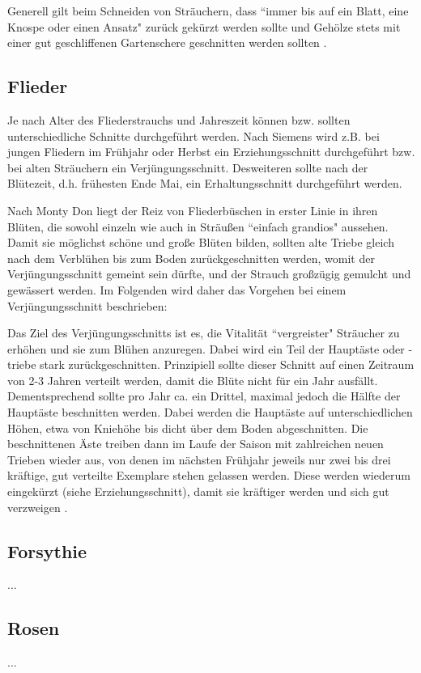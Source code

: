 \documentclass[]{article}
\begin{document}
Generell gilt beim Schneiden von Sträuchern, dass ``immer bis auf ein Blatt, eine Knospe oder einen Ansatz" zurück gekürzt werden sollte und Gehölze stets mit einer gut geschliffenen Gartenschere geschnitten werden sollten \cite[S.~257]{Don2021}.

\subsection{Flieder}

Je nach Alter des Fliederstrauchs und Jahreszeit können bzw. sollten unterschiedliche Schnitte durchgeführt werden.
Nach Siemens \cite{Siemens2021} wird z.B. bei jungen Fliedern im Frühjahr oder Herbst ein Erziehungsschnitt durchgeführt bzw. bei alten Sträuchern ein Verjüngungsschnitt.
Desweiteren sollte nach der Blütezeit, d.h. frühesten Ende Mai, ein Erhaltungsschnitt durchgeführt werden.

Nach Monty Don \cite[S.~258]{Don2021} liegt der Reiz von Fliederbüschen in erster Linie in ihren Blüten, die sowohl einzeln wie auch in Sträußen ``einfach grandios" aussehen.
Damit sie möglichst schöne und große Blüten bilden, sollten alte Triebe gleich nach dem Verblühen bis zum Boden zurückgeschnitten werden, womit der Verjüngungsschnitt gemeint sein dürfte, und der Strauch großzügig gemulcht und gewässert werden.
Im Folgenden wird daher das Vorgehen bei einem Verjüngungsschnitt beschrieben:

Das Ziel des Verjüngungsschnitts ist es, die Vitalität ``vergreister" Sträucher zu erhöhen und sie zum Blühen anzuregen. 
Dabei wird ein Teil der Hauptäste oder -triebe stark zurückgeschnitten.
Prinzipiell sollte dieser Schnitt auf einen Zeitraum von 2-3 Jahren verteilt werden, damit die Blüte nicht für ein Jahr ausfällt.
Dementsprechend sollte pro Jahr ca. ein Drittel, maximal jedoch die Hälfte der Hauptäste beschnitten werden.
Dabei werden die Hauptäste auf unterschiedlichen Höhen, etwa von Kniehöhe bis dicht über dem Boden abgeschnitten.
Die beschnittenen Äste treiben dann im Laufe der Saison mit zahlreichen neuen Trieben wieder aus, von denen im nächsten Frühjahr jeweils nur zwei bis drei kräftige, gut verteilte Exemplare stehen gelassen werden.
Diese werden wiederum eingekürzt (siehe Erziehungsschnitt), damit sie kräftiger werden und sich gut verzweigen \cite{Siemens2021}. 

\subsection{Forsythie}

...

\subsection{Rosen}

...


\pagebreak



\end{document}
